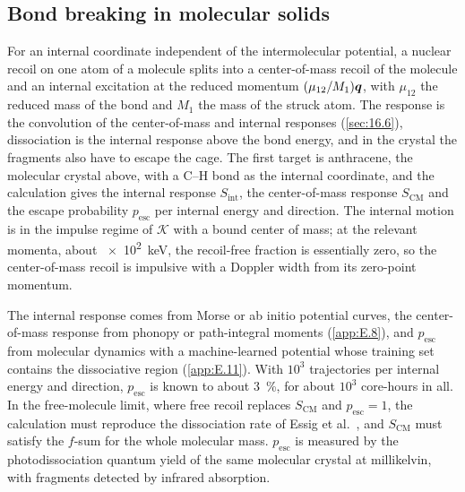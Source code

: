 \subsection{Bond breaking in molecular solids}

For an internal coordinate independent of the intermolecular potential, a nuclear recoil on one atom of a molecule splits into a center-of-mass recoil of the molecule and an internal excitation at the reduced momentum $(\mu_{12}/M_1)\bm{q}$, with $\mu_{12}$ the reduced mass of the bond and $M_1$ the mass of the struck atom. The response is the convolution of the center-of-mass and internal responses (\cref{sec:16.6}), dissociation is the internal response above the bond energy, and in the crystal the fragments also have to escape the cage. The first target is anthracene, the molecular crystal above, with a C--H bond as the internal coordinate, and the calculation gives the internal response $S_{\mathrm{int}}$, the center-of-mass response $S_{\mathrm{CM}}$ and the escape probability $p_{\mathrm{esc}}$ per internal energy and direction. The internal motion is in the impulse regime of $\mathcal{K}$ with a bound center of mass; at the relevant momenta, about \SI{e2}{keV}, the recoil-free fraction is essentially zero, so the center-of-mass recoil is impulsive with a Doppler width from its zero-point momentum.

The internal response comes from Morse or ab initio potential curves, the center-of-mass response from phonopy or path-integral moments (\cref{app:E.8}), and $p_{\mathrm{esc}}$ from molecular dynamics with a machine-learned potential whose training set contains the dissociative region (\cref{app:E.11}). With $10^3$ trajectories per internal energy and direction, $p_{\mathrm{esc}}$ is known to about \SI{3}{\percent}, for about $10^3$ core-hours in all. In the free-molecule limit, where free recoil replaces $S_{\mathrm{CM}}$ and $p_{\mathrm{esc}} = 1$, the calculation must reproduce the dissociation rate of Essig et al.~\cite{essig2017detection}, and $S_{\mathrm{CM}}$ must satisfy the $f$-sum for the whole molecular mass. $p_{\mathrm{esc}}$ is measured by the photodissociation quantum yield of the same molecular crystal at millikelvin, with fragments detected by infrared absorption.

